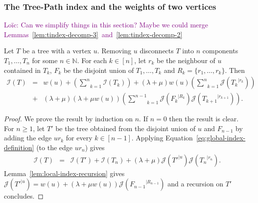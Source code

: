 \documentclass[11 pt]{modarticle}
\newcommand{\cN}{\mathbb{N}}
\newcommand{\wmap}{w}
\newcommand{\rtree}[2]{{#1}^{\lvert #2}}
\newcommand{\indexsymbol}{\mathcal{I}}
\newcommand{\tindex}[1]{\indexsymbol(#1)}
\newcommand{\rindexsymbol}{\mathcal{J}}
\newcommand{\rindex}[2]{\rindexsymbol(\rtree{#2}{#1})}
\newcommand{\ldcomment}[1]{\textcolor{purple}{{\footnotesize Loïc:} #1}}
\begin{document}
\subsubsection{The Tree-Path index and the weights of two vertices}

\ldcomment{Can we simplify things in this section? Maybe we could merge Lemmas~\ref{lem:tindex-decomp-3}~and~\ref{lem:tindex-decomp-2}}

\begin{lem}\label{lem:tindex-decomp-1}
Let $T$ be a tree with a vertex $u$. Removing $u$ disconnects $T$ into $n$ components $T_1,\dots, T_n$ for some $n\in \cN$. For each $k\in[n]$, let $r_k$ be the neighbour of $u$ contained in $T_k$, $F_k$ be the disjoint union of $T_1, \dots, T_k$ and $R_k = \{r_1, \dots, r_k\}$. Then
\begin{eqnarray*}
	\tindex{T} & = & \wmap(u) + \left(\underset{k=1}{\overset{n}{\sum}} \tindex{T_k}\right) + (\lambda + \mu)\wmap(u)\left(\underset{k=1}{\overset{n}{\sum}}\rindex{r_k}{T_k}\right) \\
	& + & (\lambda + \mu)(\lambda + \mu \wmap(u))\left(\underset{k=1}{\overset{n-1}{\sum}}\rindex{R_k}{F_k}\rindex{r_{k+1}}{T_{k+1}}\right).
\end{eqnarray*}
\end{lem}

\begin{proof}
We prove the result by induction on $n$. If $n = 0$ then the result is clear. For $n \geq 1$, let $T'$ be the tree obtained from the disjoint union of $u$ and $F_{n-1}$ by adding the edge $u r_k$ for every $k \in [n-1]$. Applying Equation~\eqref{eq:global-index-definition} (to the edge $u r_n$) gives
\begin{eqnarray*}
	\tindex{T} & = & \tindex{T'} + \tindex{T_n} + (\lambda + \mu) \rindex{u}{T'} \rindex{r_n}{T_n}.
\end{eqnarray*}
Lemma~\ref{lem:local-index-recursion} gives $\rindex{u}{T'} = \wmap(u) + (\lambda + \mu \wmap(u)) \rindex{R_{n-1}}{F_{n-1}}$ and a recursion on $T'$ concludes.
\end{proof}
\end{document}

